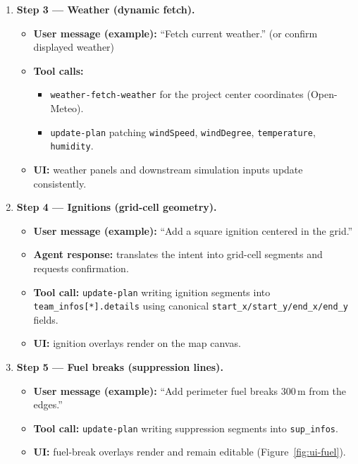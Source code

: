 \documentclass[12pt]{article}
\begin{document}
\begin{enumerate}
  \item \textbf{Step 3 --- Weather (dynamic fetch).}
  \begin{itemize}
    \item \textbf{User message (example):} ``Fetch current weather.'' (or confirm displayed weather)
    \item \textbf{Tool calls:}
      \begin{itemize}
        \item \texttt{weather-fetch-weather} for the project center coordinates (Open-Meteo).
        \item \texttt{update-plan} patching \texttt{windSpeed}, \texttt{windDegree}, \texttt{temperature},
              \texttt{humidity}.
      \end{itemize}
    \item \textbf{UI:} weather panels and downstream simulation inputs update consistently.
  \end{itemize}

  \item \textbf{Step 4 --- Ignitions (grid-cell geometry).}
  \begin{itemize}
    \item \textbf{User message (example):} ``Add a square ignition centered in the grid.'' 
    \item \textbf{Agent response:} translates the intent into grid-cell segments and requests confirmation.
    \item \textbf{Tool call:} \texttt{update-plan} writing ignition segments into \texttt{team\_infos[*].details}
          using canonical \texttt{start\_x/start\_y/end\_x/end\_y} fields.
    \item \textbf{UI:} ignition overlays render on the map canvas.
  \end{itemize}

  \item \textbf{Step 5 --- Fuel breaks (suppression lines).}
  \begin{itemize}
    \item \textbf{User message (example):} ``Add perimeter fuel breaks 300\,m from the edges.''
    \item \textbf{Tool call:} \texttt{update-plan} writing suppression segments into \texttt{sup\_infos}.
    \item \textbf{UI:} fuel-break overlays render and remain editable (Figure~\ref{fig:ui-fuel}).
  \end{itemize}


\end{enumerate}
\end{document}
